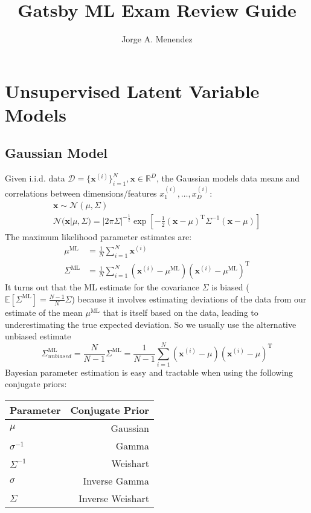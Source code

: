 \documentclass[a4paper]{article}
\title{Gatsby ML Exam Review Guide}
\author{Jorge A. Menendez}
\begin{document}
\maketitle
\tableofcontents

\section{Unsupervised Latent Variable Models}
\subsection{Gaussian Model}
Given i.i.d. data $\mathcal{D} = \{\mathbf{x}^{(i)}\}_{i=1}^N, \mathbf{x}\in\mathbb{R}^D$, the Gaussian models data means and correlations between dimensions/features $x^{(i)}_1,\ldots,x^{(i)}_D$:
\begin{gather*}
\mathbf{x} \sim \mathcal{N}(\mu,\Sigma) \\
\mathcal{N}(\mathbf{x}|\mu,\Sigma) = |2\pi\Sigma|^{-\frac{1}{2}}\exp\left[-\frac{1}{2}\left(\mathbf{x}-\mu\right)^\textrm{T}\Sigma^{-1}\left(\mathbf{x}-\mu\right)\right]
\end{gather*}
The maximum likelihood parameter estimates are:
\begin{align*}
\mu^{\textrm{ML}} &= \frac{1}{N}\sum_{i=1}^N \mathbf{x}^{(i)} \\
\Sigma^{\textrm{ML}} &= \frac{1}{N}\sum_{i=1}^N (\mathbf{x}^{(i)}-\mu^\textrm{ML})(\mathbf{x}^{(i)}-\mu^\textrm{ML})^\textrm{T}
\end{align*}
It turns out that the ML estimate for the covariance $\Sigma$ is biased ($\mathbb{E}\left[\Sigma^\textrm{ML}\right] = \frac{N-1}{N} \Sigma$) because it involves estimating deviations of the data from our estimate of the mean $\mu^\textrm{ML}$ that is itself based on the data, leading to underestimating the true expected deviation. So we usually use the alternative unbiased estimate
\[\Sigma^\textrm{ML}_{unbiased} = \frac{N}{N-1}\Sigma^\textrm{ML} = \frac{1}{N-1}\sum_{i=1}^N (\mathbf{x}^{(i)}-\mu)(\mathbf{x}^{(i)}-\mu)^\textrm{T}\]
Bayesian parameter estimation is easy and tractable when using the following conjugate priors:
\begin{table}[H]
\centering
\begin{tabular}{l|r}
Parameter & Conjugate Prior \\\hline
$\mu$ & Gaussian \\
$\sigma^{-1}$ & Gamma \\
$\Sigma^{-1}$ & Weishart \\
$\sigma$ & Inverse Gamma \\
$\Sigma$ & Inverse Weishart
\end{tabular}
\end{table}
\end{document}
